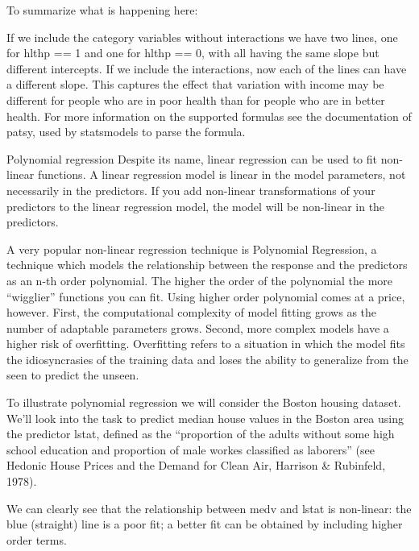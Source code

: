 \begin{frame}[fragile]
	\Large
To summarize what is happening here:

If we include the category variables without interactions we have two lines, one for hlthp == 1 and one for hlthp == 0, with all having the same slope but different intercepts.
If we include the interactions, now each of the lines can have a different slope. This captures the effect that variation with income may be different for people who are in poor health than for people who are in better health.
For more information on the supported formulas see the documentation of patsy, used by statsmodels to parse the formula.
\end{frame}

\begin{frame}[fragile]
	\Large
Polynomial regression
Despite its name, linear regression can be used to fit non-linear functions. A linear regression model is linear in the model parameters, not necessarily in the predictors. If you add non-linear transformations of your predictors to the linear regression model, the model will be non-linear in the predictors.
\end{frame}

\begin{frame}[fragile]
	\Large
A very popular non-linear regression technique is Polynomial Regression, a technique which models the relationship between the response and the predictors as an n-th order polynomial. The higher the order of the polynomial the more “wigglier” functions you can fit. Using higher order polynomial comes at a price, however. First, the computational complexity of model fitting grows as the number of adaptable parameters grows. Second, more complex models have a higher risk of overfitting. Overfitting refers to a situation in which the model fits the idiosyncrasies of the training data and loses the ability to generalize from the seen to predict the unseen.
\end{frame}

\begin{frame}[fragile]
	\Large
To illustrate polynomial regression we will consider the Boston housing dataset. We’ll look into the task to predict median house values in the Boston area using the predictor lstat, defined as the “proportion of the adults without some high school education and proportion of male workes classified as laborers” (see Hedonic House Prices and the Demand for Clean Air, Harrison & Rubinfeld, 1978).

We can clearly see that the relationship between medv and lstat is non-linear: the blue (straight) line is a poor fit; a better fit can be obtained by including higher order terms.
\end{frame}

